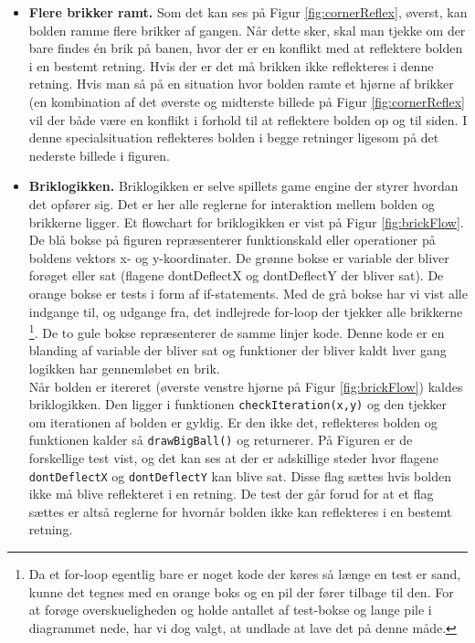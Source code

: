 \begin{itemize}
\item \textbf{Flere brikker ramt.} Som det kan ses på Figur \ref{fig:cornerReflex}, øverst, kan bolden ramme flere brikker af gangen. Når dette sker, skal man tjekke om der bare findes én brik på banen, hvor der er en konflikt med at reflektere bolden i en bestemt retning. Hvis der er det må brikken ikke reflekteres i denne retning. Hvis man så på en situation hvor bolden ramte et hjørne af brikker (en kombination af det øverste og midterste billede på Figur \ref{fig:cornerReflex} vil der både være en konflikt i forhold til at reflektere bolden op og til siden. I denne specialsituation reflekteres bolden i begge retninger ligesom på det nederste billede i figuren.


\item \textbf{Briklogikken.} Briklogikken er selve spillets game engine der styrer hvordan det opfører sig. Det er her alle reglerne for interaktion mellem bolden og brikkerne ligger. Et flowchart for briklogikken er vist på Figur \ref{fig:brickFlow}. De blå bokse på figuren repræsenterer funktionskald eller operationer på boldens vektors x- og y-koordinater. De grønne bokse er variable der bliver forøget eller sat (flagene dontDeflectX og dontDeflectY der bliver sat). De orange bokse er tests i form af if-statements. Med de grå bokse har vi vist alle indgange til, og udgange fra, det indlejrede for-loop der tjekker alle brikkerne
\footnote{Da et for-loop egentlig bare er noget kode der køres så længe en test er sand, kunne det tegnes med en orange boks og en pil der fører tilbage til den. For at forøge overskueligheden og holde antallet af test-bokse og lange pile i diagrammet nede, har vi dog valgt, at undlade at lave det på denne måde.}. De to gule bokse repræsenterer de samme linjer kode. Denne kode er en blanding af variable der bliver sat og funktioner der bliver kaldt hver gang logikken har gennemløbet en brik. \\

Når bolden er itereret (øverste venstre hjørne på Figur  \ref{fig:brickFlow}) kaldes briklogikken. Den ligger i funktionen \texttt{checkIteration(x,y)} og den tjekker om iterationen af bolden er gyldig. Er den ikke det, reflekteres bolden og funktionen kalder så \texttt{drawBigBall()} og returnerer. 
På Figuren er de forskellige test vist, og det kan ses at der er adskillige steder hvor flagene \texttt{dontDeflectX} og \texttt{dontDeflectY} kan blive sat. Disse flag sættes hvis bolden ikke må blive reflekteret i en retning. De test der går forud for at et flag sættes er altså reglerne for hvornår bolden ikke kan reflekteres i en bestemt retning. 


\end{itemize}
